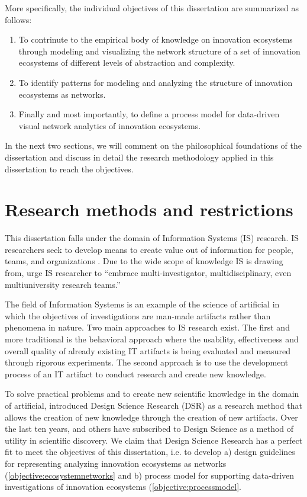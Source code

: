 More specifically, the individual objectives of this dissertation are summarized as follows:

\begin{enumerate}[label=\textbf{Objective \Roman*},align=left]
	\item To contrinute to the empirical body of knowledge on innovation ecosystems through modeling and visualizing the network structure of a set of innovation ecosystems of different levels of abstraction and complexity.
    \label{objective:empirical}
	\item To identify patterns for modeling and analyzing the structure of innovation ecosystems as networks.
    \label{objective:ecosystemnetworks}
	\item Finally and most importantly, to define a process model for data-driven visual network analytics of innovation ecosystems.
     \label{objective:processmodel}
\end{enumerate}

In the next two sections, we will comment on the philosophical foundations of the dissertation and discuss in detail the research methodology applied in this dissertation to reach the objectives.

\section{Research methods and restrictions}
\label{sec:methods}

This dissertation falls under the domain of Information Systems (IS) research. IS researchers seek to develop means to create value out of information for people, teams, and organizations \citep{Nunamaker2011TowardSystems}. Due to the wide scope of knowledge IS is drawing from, \cite{Nunamaker2011TowardSystems} urge IS researcher to ``embrace multi-investigator, multidisciplinary, even multiuniversity research teams.''

The field of Information Systems is an example of the science of artificial \citep{Simon1969} in which the objectives of investigations are man-made artifacts rather than phenomena in nature. Two main approaches to IS research exist. The first and more traditional is the behavioral approach where the usability, effectiveness and overall quality of already existing IT artifacts is being evaluated and measured through rigorous experiments. The second approach is to use the development process of an IT artifact to conduct research and create new knowledge. 

To solve practical problems and to create new scientific knowledge in the domain of artificial, \citep{Hevner2004} introduced Design Science Research (DSR) as a research method that allows the creation of new knowledge through the creation of new artifacts. Over the last ten years, \cite{Vaishnavi2007,Peffers2007} and others have subscribed to Design Science as a method of utility in scientific discovery. We claim that Design Science Research has a perfect fit to meet the objectives of this dissertation, i.e. to develop a) design guidelines for representing analyzing innovation ecosystems as networks (\ref{objective:ecosystemnetworks} and b) process model for supporting data-driven investigations of innovation ecosystems (\ref{objective:processmodel}.

